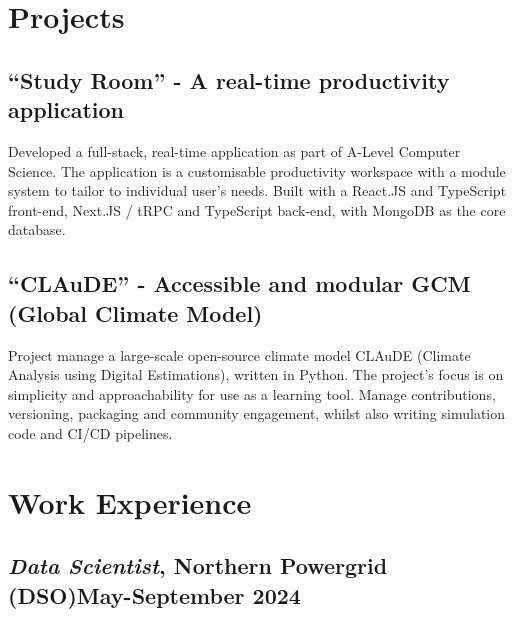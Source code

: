 \documentclass[9pt]{extarticle}
\begin{document}
\begin{minipage}{0.65\textwidth}
	\raggedright
	\section{Projects}
	\subsection{``Study Room'' - A real-time productivity application}
	Developed a full-stack, real-time application as part of A-Level Computer Science.
	The application is a customisable productivity workspace with a module system to tailor to individual user's needs.
	Built with a React.JS and TypeScript front-end, Next.JS / tRPC and TypeScript back-end, with MongoDB as the core database.
	\vspace{.3cm}

	\subsection{``CLAuDE'' - Accessible and modular GCM (Global Climate Model)}
	Project manage a large-scale open-source climate model CLAuDE (Climate Analysis using Digital Estimations), written in Python.
	The project's focus is on simplicity and approachability for use as a learning tool.
	Manage contributions, versioning, packaging and community engagement, whilst also writing simulation code and CI/CD pipelines.

	\vspace{.3cm}
	\section{Work Experience}

	\subsection{\textit{Data Scientist}, Northern Powergrid (DSO)\hfill May-September 2024}


\end{minipage}
\end{document}
